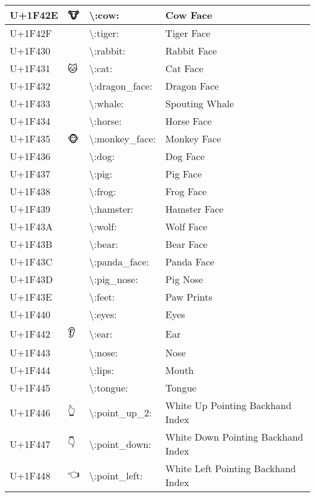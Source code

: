 \begin{table}[h]
\begin{tabulary}{\linewidth}{|L|L|L|L|}
\hline
U+1F42E & 🐮 & {\textbackslash}:cow: & Cow Face \\
\hline
U+1F42F & 🐯 & {\textbackslash}:tiger: & Tiger Face \\
\hline
U+1F430 & 🐰 & {\textbackslash}:rabbit: & Rabbit Face \\
\hline
U+1F431 & 🐱 & {\textbackslash}:cat: & Cat Face \\
\hline
U+1F432 & 🐲 & {\textbackslash}:dragon\_face: & Dragon Face \\
\hline
U+1F433 & 🐳 & {\textbackslash}:whale: & Spouting Whale \\
\hline
U+1F434 & 🐴 & {\textbackslash}:horse: & Horse Face \\
\hline
U+1F435 & 🐵 & {\textbackslash}:monkey\_face: & Monkey Face \\
\hline
U+1F436 & 🐶 & {\textbackslash}:dog: & Dog Face \\
\hline
U+1F437 & 🐷 & {\textbackslash}:pig: & Pig Face \\
\hline
U+1F438 & 🐸 & {\textbackslash}:frog: & Frog Face \\
\hline
U+1F439 & 🐹 & {\textbackslash}:hamster: & Hamster Face \\
\hline
U+1F43A & 🐺 & {\textbackslash}:wolf: & Wolf Face \\
\hline
U+1F43B & 🐻 & {\textbackslash}:bear: & Bear Face \\
\hline
U+1F43C & 🐼 & {\textbackslash}:panda\_face: & Panda Face \\
\hline
U+1F43D & 🐽 & {\textbackslash}:pig\_nose: & Pig Nose \\
\hline
U+1F43E & 🐾 & {\textbackslash}:feet: & Paw Prints \\
\hline
U+1F440 & 👀 & {\textbackslash}:eyes: & Eyes \\
\hline
U+1F442 & 👂 & {\textbackslash}:ear: & Ear \\
\hline
U+1F443 & 👃 & {\textbackslash}:nose: & Nose \\
\hline
U+1F444 & 👄 & {\textbackslash}:lips: & Mouth \\
\hline
U+1F445 & 👅 & {\textbackslash}:tongue: & Tongue \\
\hline
U+1F446 & 👆 & {\textbackslash}:point\_up\_2: & White Up Pointing Backhand Index \\
\hline
U+1F447 & 👇 & {\textbackslash}:point\_down: & White Down Pointing Backhand Index \\
\hline
U+1F448 & 👈 & {\textbackslash}:point\_left: & White Left Pointing Backhand Index \\
\hline

\end{tabulary}
\end{table}
